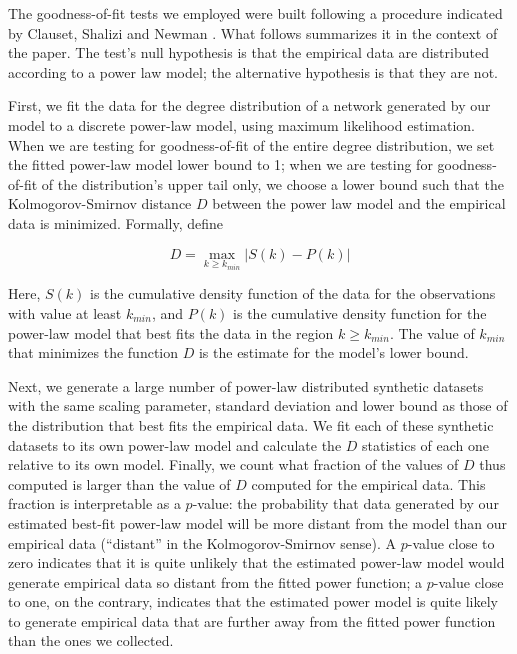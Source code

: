 \documentclass{bmcart}
\begin{document}
The goodness-of-fit tests we employed were built following a procedure indicated by Clauset, Shalizi and Newman \cite[pp. 15-18]{clauset2009power}. What follows summarizes it in the context of the paper. The test's null hypothesis is that the empirical data are distributed according to a power law model; the alternative hypothesis is that they are not.

First, we fit the data for the degree distribution of a network generated by our model to a discrete power-law model, using maximum likelihood estimation. When we are testing for goodness-of-fit of the entire degree distribution, we set the fitted power-law model lower bound to 1; when we are testing for goodness-of-fit of the distribution's upper tail only, we choose a lower bound  such that the Kolmogorov-Smirnov distance $D$ between the power law model and the empirical data is minimized. Formally, define

$$D = \max_{k \geq k_{min}} | S(k) - P(k) |$$

Here, $S(k)$ is the cumulative density function of the data for the observations with value at least $k_{min}$, and $P(k)$ is the cumulative density function for the power-law model that best fits the data in the region $k \geq k_{min}$. The value of $k_{min}$ that minimizes the function $D$ is the estimate for the model's lower bound.

Next, we generate a large number of power-law distributed synthetic datasets with the same scaling parameter, standard deviation and lower bound as those of the distribution that best fits the empirical data. We fit each of these synthetic datasets to its own power-law model and calculate the $D$ statistics of each one relative to its own model. Finally, we count what fraction of the values of $D$ thus computed is larger than the value of $D$ computed for the empirical data. This fraction is interpretable as a $p$-value: the probability that data generated by our estimated best-fit power-law model will be more distant from the model than our empirical data (``distant'' in the Kolmogorov-Smirnov sense). A $p$-value close to zero indicates that it is quite unlikely that the estimated power-law model would generate empirical data so distant from the fitted power function; a $p$-value close to one, on the contrary, indicates that the estimated power model is quite likely to generate empirical data that are further away from the fitted power function than the ones we collected. 
\end{document}
